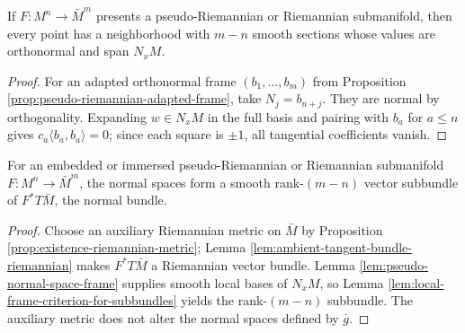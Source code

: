 \begin{lemma}
\label{lem:pseudo-normal-space-frame}





If $F:M^n\to\bar M^m$ presents a pseudo-Riemannian or Riemannian submanifold, then every point has a neighborhood with $m-n$ smooth sections whose values are orthonormal and span $N_xM$.
\end{lemma}
\begin{proof}

\sketch For an adapted orthonormal frame $(b_1,\ldots,b_m)$ from Proposition \ref{prop:pseudo-riemannian-adapted-frame}, take $N_j=b_{n+j}$. They are normal by orthogonality. Expanding $w\in N_xM$ in the full basis and pairing with $b_a$ for $a\le n$ gives $c_a\langle b_a,b_a\rangle=0$; since each square is $\pm1$, all tangential coefficients vanish.
\end{proof}

\begin{corollary}
\label{cor:normal-bundle-pseudo-riemannian-submanifold}





For an embedded or immersed pseudo-Riemannian or Riemannian submanifold $F:M^n\to\bar M^m$, the normal spaces form a smooth rank-$(m-n)$ vector subbundle of $F^*T\bar M$, the normal bundle.
\end{corollary}
\begin{proof}

\sketch Choose an auxiliary Riemannian metric on $\bar M$ by Proposition \ref{prop:existence-riemannian-metric}; Lemma \ref{lem:ambient-tangent-bundle-riemannian} makes $F^*T\bar M$ a Riemannian vector bundle. Lemma \ref{lem:pseudo-normal-space-frame} supplies smooth local bases of $N_xM$, so Lemma \ref{lem:local-frame-criterion-for-subbundles} yields the rank-$(m-n)$ subbundle. The auxiliary metric does not alter the normal spaces defined by $\bar g$.
\end{proof}

